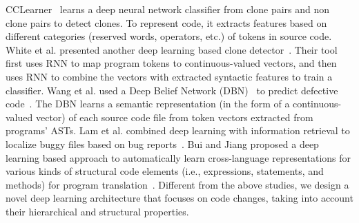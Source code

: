 CCLearner~\cite{li2017cclearner} learns a deep neural network classifier
from clone pairs and non clone pairs to detect clones.  To represent code,
it extracts features based on different categories (reserved words,
operators, etc.) of tokens in source code. White et al. presented another
deep learning based clone detector~\cite{white2016deep}. Their tool first
uses RNN to map program tokens to continuous-valued vectors, and then uses
RNN to combine the vectors with extracted syntactic features to train a
classifier. Wang et al. used a Deep Belief Network
(DBN)~\cite{hinton2009deep} to predict defective
code~\cite{wang2016automatically}. The DBN learns a semantic representation
(in the form of a continuous-valued vector) of each source code file from
token vectors extracted from programs' ASTs. Lam et al. combined deep
learning with information
retrieval to localize
buggy files based on bug reports~\cite{lam2017bug}. Bui and Jiang
proposed a deep learning based approach to automatically learn
cross-language representations for various kinds of structural code
elements (i.e., expressions, statements, and methods) for program
translation~\cite{bui2018hierarchical}. Different from the above
studies, we design a novel deep learning architecture that focuses on code
changes, taking into account their hierarchical and structural properties.




